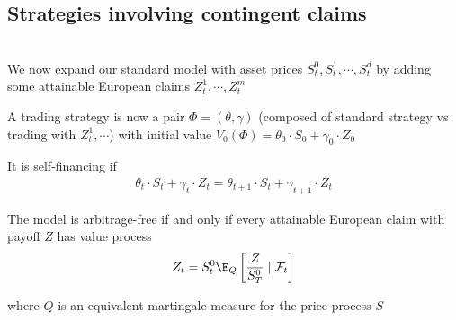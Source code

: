 \subsection{Strategies involving contingent claims}\hfill\\
\noindent We now expand our standard model with asset prices $S_t^0,S_t^1,\cdots, S_t^d$ by adding some attainable European claims $Z_t^1,\cdots, Z_t^m$
\par\bigskip
\noindent A trading strategy is now a pair $\Phi= (\theta,\gamma)$ (composed of standard strategy vs trading with $Z_t^1,\cdots$) with initial value $V_0(\Phi) = \theta_0\cdot S_0+\gamma_0\cdot Z_0$\par
\noindent It is self-financing if 
\begin{equation*}
  \begin{gathered}
    \theta_t\cdot S_t + \gamma_t\cdot Z_t = \theta_{t+1}\cdot S_t +\gamma_{t+1}\cdot Z_t
  \end{gathered}
\end{equation*}
\par\bigskip
\begin{theo}[]{}
  The model is arbitrage-free if and only if every attainable European claim with payoff  $Z$ has value process
  \begin{equation*}
    \begin{gathered}
      Z_t = S_t^0\E_Q\left[\dfrac{Z}{S_T^0}\mid\mathcal{F}_t\right]
    \end{gathered}
  \end{equation*}\par
  \noindent where $Q$ is an equivalent martingale measure for the price process $S$
\end{theo}
\par\bigskip
